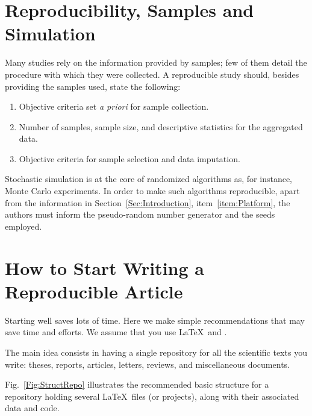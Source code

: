 \documentclass[journal,twopage]{IEEEtran}
\begin{document}
\section{Reproducibility, Samples and Simulation}

Many studies rely on the information provided by samples;
few of them detail the procedure with which they were collected.
A reproducible study should, besides providing the samples used, state the following:
\begin{enumerate}
	\item Objective criteria set \textit{a priori} for sample collection.
	\item Number of samples, sample size, and descriptive statistics for the aggregated data.
	\item Objective criteria for sample selection and data imputation.
\end{enumerate}

Stochastic simulation is at the core of randomized algorithms as, for instance, Monte Carlo experiments.
In order to make such algorithms reproducible, apart from the information in Section~\ref{Sec:Introduction}, item~\ref{item:Platform}, the authors must inform the pseudo-random number generator and the seeds employed.

\section{How to Start Writing a Reproducible Article}

Starting well saves lots of time.
Here we make simple recommendations that may save time and efforts.
We assume that you use \LaTeX\ and \BibTeX.

The main idea consists in having a single repository for all the scientific texts you write: 
theses, 
reports, 
articles, 
letters,
reviews,
and miscellaneous documents.

Fig.~\ref{Fig:StructRepo} illustrates the recommended basic structure for a repository holding several \LaTeX\ files (or projects), along with their associated data and code.
\end{document}
